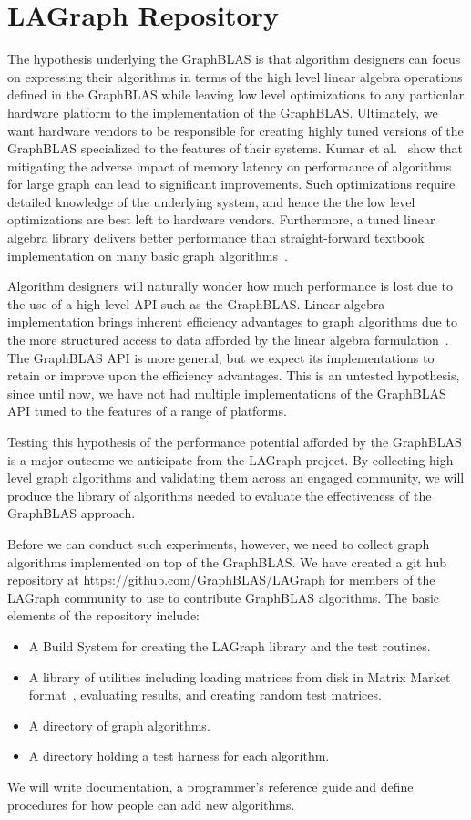 \section{LAGraph Repository}
\label{sec:repo}

The hypothesis underlying the GraphBLAS is that algorithm designers can focus on expressing their algorithms
in terms of the high level linear algebra operations defined in the GraphBLAS while leaving low level
optimizations to any particular hardware platform to the implementation of the GraphBLAS.  Ultimately, 
we want hardware vendors to be responsible for creating highly tuned versions of the GraphBLAS
specialized to the features of their systems.
Kumar et al.~\cite{KuHPEC2016} show that mitigating the adverse impact of memory
latency on performance of algorithms for large graph can lead to significant improvements.
Such optimizations require detailed knowledge of the underlying system, and hence the 
the low level optimizations are best left to hardware vendors.
Furthermore, a tuned linear algebra library delivers
better performance than straight-forward textbook implementation on many basic graph algorithms~\cite{KuJour}.

Algorithm designers will naturally wonder how much performance is lost due to the use of a high 
level API such as the GraphBLAS. Linear algebra 
implementation brings inherent efficiency advantages to 
graph algorithms due to the more structured access to data afforded by the linear algebra 
formulation~\cite{jwHPEC}.
The GraphBLAS API is more general, but we expect its implementations to retain or improve upon
the efficiency advantages.
This is an untested hypothesis, since until now, we have not had multiple 
implementations of the GraphBLAS API tuned to the features of a range of platforms.

Testing this hypothesis of the performance potential afforded by the GraphBLAS is a major outcome
we anticipate from the LAGraph project.  By collecting high level graph algorithms and validating them
across an engaged community, we will produce the library of algorithms needed to evaluate the 
effectiveness of the GraphBLAS approach.

Before we can conduct such experiments, however, we need to collect graph algorithms implemented on 
top of the GraphBLAS. We have created a git hub repository at
\url{https://github.com/GraphBLAS/LAGraph} for members of the LAGraph community to 
use to contribute GraphBLAS algorithms. The basic elements of the repository include:
\begin{itemize}
\item A Build System for creating the LAGraph library and the test routines.
\item A library of utilities including loading matrices from disk in Matrix Market format~\cite{MM},
    evaluating results, and creating random test matrices.
\item A directory of graph algorithms.
\item A directory holding a test harness for each algorithm.
\end{itemize}

We will write documentation, a programmer's reference guide and define procedures for how people
can add new algorithms.  
